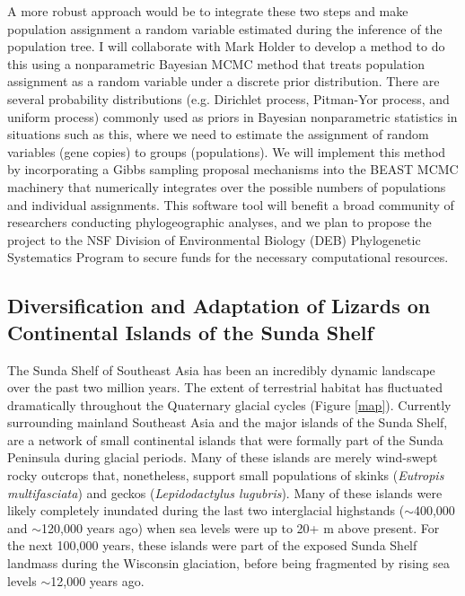 \documentclass[10pt]{article}
\begin{document}
A more robust approach would be to integrate these two steps and make population assignment a random variable estimated during the inference of the population tree.
I will collaborate with Mark Holder to develop a method to do this using a nonparametric Bayesian MCMC method that treats population assignment as a random variable under a discrete prior distribution.
There are several probability distributions (e.g. Dirichlet process, Pitman-Yor process, and uniform process) commonly used as priors in Bayesian nonparametric statistics in situations such as this, where we need to estimate the assignment of random variables (gene copies) to groups (populations).
We will implement this method by incorporating a Gibbs sampling proposal mechanisms into the BEAST MCMC machinery that numerically integrates over the possible numbers of populations and individual assignments.
This software tool will benefit a broad community of researchers conducting phylogeographic analyses, and we plan to propose the project to the NSF Division of Environmental Biology (DEB) Phylogenetic Systematics Program to secure funds for the necessary computational resources.

\subsection*{Diversification and Adaptation of Lizards on Continental Islands of the Sunda Shelf}
The Sunda Shelf of Southeast Asia has been an incredibly dynamic landscape over the past two million years.
The extent of terrestrial habitat has fluctuated dramatically throughout the Quaternary glacial cycles (Figure \ref{map}).
Currently surrounding mainland Southeast Asia and the major islands of the Sunda Shelf, are a network of small continental islands that were formally part of the Sunda Peninsula during glacial periods.
Many of these islands are merely wind-swept rocky outcrops that, nonetheless, support small populations of skinks (\emph{Eutropis multifasciata}) and geckos (\emph{Lepidodactylus lugubris}).
Many of these islands were likely completely inundated during the last two interglacial highstands ($\sim$400,000 and $\sim$120,000 years ago) when sea levels were up to 20+ m above present.
For the next 100,000 years, these islands were part of the exposed Sunda Shelf landmass during the Wisconsin glaciation, before being fragmented by rising sea levels $\sim$12,000 years ago.
\end{document}
